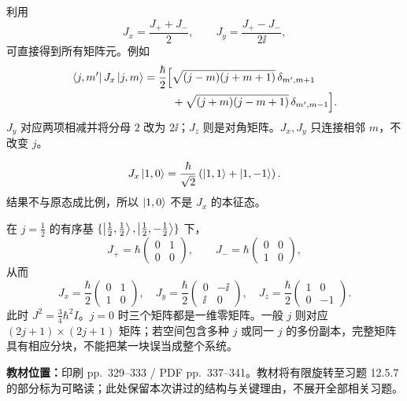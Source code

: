 利用
\begin{equation}
  J_x=\frac{J_++J_-}{2},\qquad
  J_y=\frac{J_+-J_-}{2\ii},
\end{equation}
可直接得到所有矩阵元。例如
\begin{align}
  \left\langle j,m'\right|J_x\left|j,m\right\rangle
  =\frac\hbar2\Big[&\sqrt{(j-m)(j+m+1)}\,\delta_{m',m+1}\notag\\
    &+\sqrt{(j+m)(j-m+1)}\,\delta_{m',m-1}\Big].
\end{align}
$J_y$ 对应两项相减并将分母 $2$ 改为 $2\ii$；$J_z$ 则是对角矩阵。$J_x,J_y$ 只连接相邻 $m$，不改变 $j$。

\begin{equation}
  J_x\left|1,0\right\rangle=\frac{\hbar}{\sqrt2}
    \left(\left|1,1\right\rangle+\left|1,-1\right\rangle\right).
\end{equation}
结果不与原态成比例，所以 $\left|1,0\right\rangle$ 不是 $J_x$ 的本征态。

在 $j=\tfrac12$ 的有序基 $\{\left|\tfrac12,\tfrac12\right\rangle,\left|\tfrac12,-\tfrac12\right\rangle\}$ 下，
\begin{equation}
  J_+=\hbar\begin{pmatrix}0&1\\0&0\end{pmatrix},\qquad
  J_-=\hbar\begin{pmatrix}0&0\\1&0\end{pmatrix},
\end{equation}
从而
\begin{equation}
  \boxed{J_x=\frac\hbar2\begin{pmatrix}0&1\\1&0\end{pmatrix},\quad
    J_y=\frac\hbar2\begin{pmatrix}0&-\ii\\\ii&0\end{pmatrix},\quad
    J_z=\frac\hbar2\begin{pmatrix}1&0\\0&-1\end{pmatrix}.}
\end{equation}
此时 $J^2=\tfrac34\hbar^2I$。$j=0$ 时三个矩阵都是一维零矩阵。一般 $j$ 则对应 $(2j+1)\times(2j+1)$ 矩阵；若空间包含多种 $j$ 或同一 $j$ 的多份副本，完整矩阵具有相应分块，不能把某一块误当成整个系统。

\textbf{教材位置：}印刷 pp.~329--333 / PDF pp.~337--341。教材将有限旋转至习题 12.5.7 的部分标为可略读；此处保留本次讲过的结构与关键理由，不展开全部相关习题。

